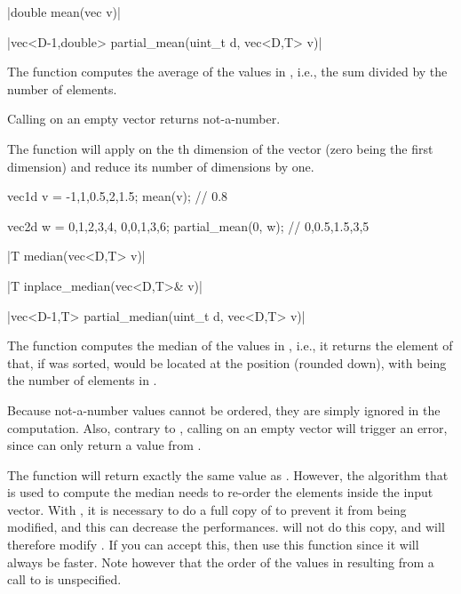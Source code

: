\funcitem \cppinline|double mean(vec v)| 

\cppinline|vec<D-1,double> partial_mean(uint_t d, vec<D,T> v)| 

The function  computes the average of the values in , i.e., the sum divided by the number of elements.

Calling  on an empty vector returns not-a-number.

The function  will apply  on the th dimension of the vector (zero being the first dimension) and reduce its number of dimensions by one.

\begin{example}
\begin{cppcode}
vec1d v = {-1,1,0.5,2,1.5};
mean(v); // 0.8

vec2d w = {{0,1,2,3,4}, {0,0,1,3,6}};
partial_mean(0, w); // {0,0.5,1.5,3,5}
\end{cppcode}
\end{example}

\funcitem \cppinline|T median(vec<D,T> v)| 

\cppinline|T inplace_median(vec<D,T>& v)| 

\cppinline|vec<D-1,T> partial_median(uint_t d, vec<D,T> v)| 

The function  computes the median of the values in , i.e., it returns the element of  that, if  was sorted, would be located at the position  (rounded down), with  being the number of elements in .

Because not-a-number values cannot be ordered, they are simply ignored in the computation. Also,
contrary to , calling  on an empty vector will trigger an error, since  can only return a value from .

The function  will return exactly the same value as . However, the algorithm that is used to compute the median needs to re-order the elements inside the input vector. With , it is necessary to do a full copy of  to prevent it from being modified, and this can decrease the performances.  will not do this copy, and will therefore modify . If you can accept this, then use this function since it will always be faster. Note however that the order of the values in  resulting from a call to  is unspecified.

